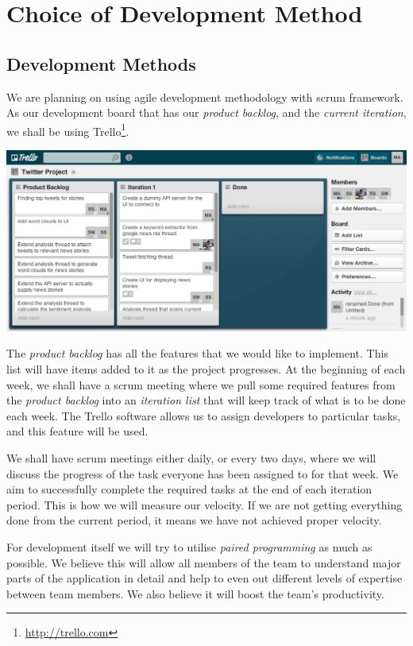 \documentclass[a4paper,11pt]{article}
\begin{document}
	\section{Choice of Development Method}
		\subsection{Development Methods}
		
			We are planning on using agile development methodology with scrum framework. As our development board that has our \emph{product backlog}, and the \emph{current iteration}, we shall be using Trello\footnote{\url{http://trello.com}}.
			\begin{center}
			\includegraphics[scale=0.4]{trello.png}
		  \end{center}
	
			The \emph{product backlog} has all the features that we would like to implement. This list will have items added to it as the project progresses. At the beginning of each week, we shall have a scrum meeting where we pull some required features from the \emph{product backlog} into an \emph{iteration list} that will keep track of what is to be done each week. The Trello software allows us to assign developers to particular tasks, and this feature will be used.
			
			We shall have scrum meetings either daily, or every two days, where we will discuss the progress of the task everyone has been assigned to for that week. We aim to successfully complete the required tasks at the end of each iteration period. This is how we will measure our velocity. If we are not getting everything done from the current period, it means we have not achieved proper velocity.
			
			For development itself we will try to utilise \emph{paired programming} as much as possible. We believe this will allow all members of the team to understand major parts of the application in detail and help to even out different levels of expertise between team members. We also believe it will boost the team's productivity.
		
\end{document}
